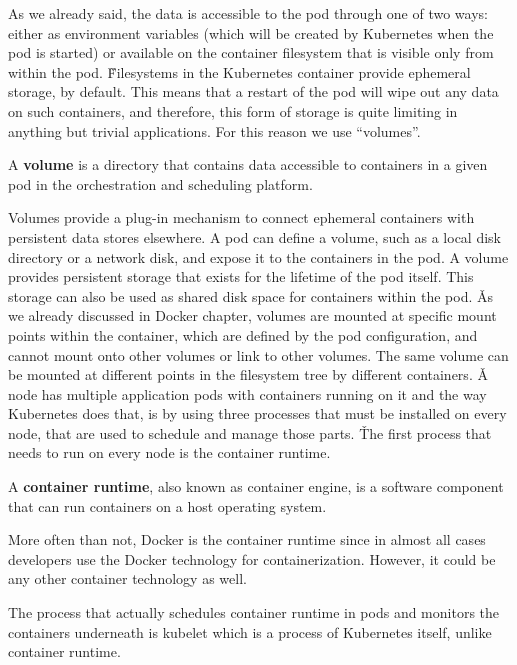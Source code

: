 As we already said, the data is accessible to the pod through one of two ways: either as environment variables (which
will be created by Kubernetes when the pod is started) or available on the container filesystem that is visible only
from within the pod. \v

Filesystems in the Kubernetes container provide ephemeral storage, by default. This means that a restart of the pod
will wipe out any data on such containers, and therefore, this form of storage is quite limiting in anything but
trivial applications. For this reason we use ``volumes''.

\bd[Volume]
A \textbf{volume} is a directory that contains data accessible to containers in a given pod in the orchestration and
scheduling platform.
\ed


Volumes provide a plug-in mechanism to connect ephemeral containers with persistent data stores elsewhere. A pod
can define a volume, such as a local disk directory or a network disk, and expose it to the containers in the pod. A
volume provides persistent storage that exists for the lifetime of the pod itself. This storage can also be used as
shared disk space for containers within the pod. \v

As we already discussed in Docker chapter, volumes are mounted at specific mount points within the container, which
are defined by the pod configuration, and cannot mount onto other volumes or link to other volumes. The same volume
can be mounted at different points in the filesystem tree by different containers. \v

A node has multiple application pods with containers running on it and the way Kubernetes does that, is by using
three processes that must be installed on every node, that are used to schedule and manage those parts. \v

The first process that needs to run on every node is the container runtime.

A \textbf{container runtime}, also known as container engine, is a software component that can run containers on a host
operating system.
\ed

More often than not, Docker is the container runtime since in almost all cases developers use the Docker technology
for containerization. However, it could be any other container technology as well.


The process that actually schedules container runtime in pods and monitors the containers underneath is kubelet which
is a process of Kubernetes itself, unlike container runtime.

